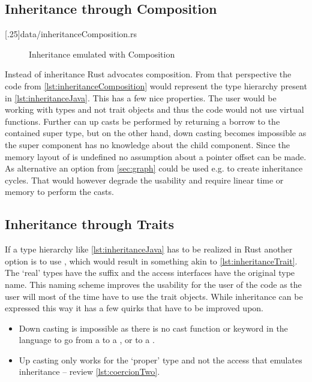 \documentclass[thesis]{subfiles}
\begin{document}
  \subsection{Inheritance through Composition}%
    \LstTikzBox{\inheritanceComposition}[.25\linewidth]{data/inheritanceComposition.rs}
    \begin{wrapfigure}{r}{0.38\textwidth}%
      \vspace*{-\baselineskip}%
      \captionsetup{type=lstlisting}%
      \begin{center}%
        \usebox{\inheritanceComposition}%
      \end{center}%
      \vspace*{-\baselineskip}%
      \caption{Inheritance emulated with Composition}\label{lst:inheritanceComposition}%
    \end{wrapfigure}%
    Instead of inheritance Rust advocates composition.
    From that perspective the code from \autoref{lst:inheritanceComposition} would represent the type hierarchy present in \autoref{lst:inheritanceJava}.
    This has a few nice properties.
    The user would be working with types and not trait objects and thus the code would not use virtual functions.
    Further can up casts be performed by returning a borrow to the contained super type, but on the other hand, down casting becomes impossible as the super component has no knowledge about the child component.
    Since the memory layout of \structs is undefined\autocite[0079-undefined-struct-layout]{rust-rfc} no assumption about a pointer offset can be made.
    As alternative an option from \autoref{sec:graph} could be used e.g.  to create inheritance cycles.
    That would however degrade the usability and require linear time or memory to perform the casts.

  \subsection{Inheritance through Traits}\label{sec:magic}
    If a type hierarchy like \autoref{lst:inheritanceJava} has to be realized in Rust another option is to use \traits, which would result in something akin to \autoref{lst:inheritanceTrait}.
    The `real' types have the suffix  and the access interfaces have the original type name.
    This naming scheme improves the usability for the user of the code as the user will most of the time have to use the trait objects.
    While inheritance can be expressed this way it has a few quirks that have to be improved upon.
    \begin{itemize}
      \item Down casting is impossible as there is no cast function or keyword in the language to go from a \trait to a \struct, or to a \trait.
      \item Up casting only works for the `proper' type and not the access \trait that emulates inheritance -- review \autoref{lst:coercionTwo}.
    \end{itemize}
\end{document}
